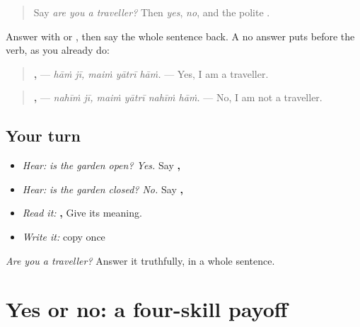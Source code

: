 \begin{quote}
Say \emph{are you a traveller?} Then \emph{yes}, \emph{no}, and the polite \textbf{}.
\end{quote}

\begin{grammarlens}[title={Grammar Lens: answering}]
Answer with \textbf{ } or \textbf{ }, then say the whole sentence back. A no answer puts \textbf{} before the verb, as you already do:

\begin{quote}
\textbf{ ,   } — \emph{hāṁ jī, maiṁ yātrī hāṁ.} — Yes, I am a traveller.
\end{quote}

\begin{quote}
\textbf{ ,    } — \emph{nahīṁ jī, maiṁ yātrī nahīṁ hāṁ.} — No, I am not a traveller.
\end{quote}
\end{grammarlens}

\subsection*{Your turn}
\begin{itemize}
\raggedright
  \item \emph{Hear:} \emph{is the garden open? Yes.} Say \textbf{ ,   }
  \item \emph{Hear:} \emph{is the garden closed? No.} Say \textbf{ ,    }
  \item \emph{Read it:} \textbf{ ,    } Give its meaning.
  \item \emph{Write it:} copy \textbf{ } once
\end{itemize}

\begin{tcolorbox}[breakable,colback=teal!4,colframe=teal!35!black,title={Before you move on}]
\emph{Are you a traveller?} Answer it truthfully, in a whole sentence.
\end{tcolorbox}
\section[\texorpdfstring{\pa{ਕੀ} \pa{ਤੁਸੀਂ} \pa{ਯਾਤਰੀ} \pa{ਹੋ}? (kī tusīṁ yātrī ho?)}{ਕੀ ਤੁਸੀਂ ਯਾਤਰੀ ਹੋ? (kī tusīṁ yātrī ho?)}]{Yes or no: a four-skill payoff}


